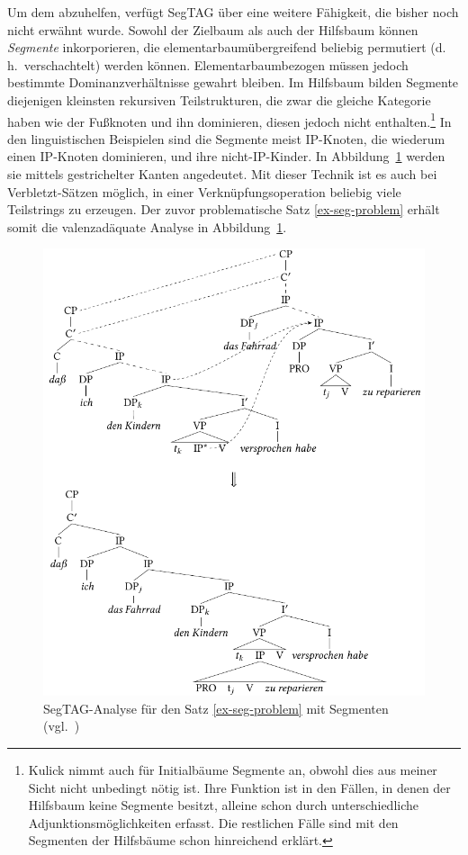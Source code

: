 Um dem abzuhelfen, verfügt SegTAG über eine weitere Fähigkeit, die bisher noch nicht erwähnt wurde. Sowohl der Zielbaum als auch der Hilfsbaum können {\it Segmente} inkorporieren, die elementarbaumübergreifend beliebig permutiert (d.\,h.\ verschachtelt) werden können. Elementarbaumbezogen müssen jedoch bestimmte Dominanzverhältnisse gewahrt bleiben. Im Hilfsbaum bilden Segmente diejenigen kleinsten rekursiven Teilstrukturen, die zwar die gleiche Kategorie haben wie der Fu\ss knoten und ihn dominieren, diesen jedoch nicht enthalten.\footnote{Kulick nimmt auch für Initialbäume Segmente an, obwohl dies aus meiner Sicht nicht unbedingt nötig ist. Ihre Funktion ist in den Fällen, in denen der Hilfsbaum keine Segmente besitzt, alleine schon durch unterschiedliche Adjunktionsmöglichkeiten erfasst. Die restlichen Fälle sind mit den Segmenten der Hilfsbäume schon hinreichend erklärt.} In den linguistischen Beispielen sind die Segmente meist IP-Knoten, die wiederum einen IP-Knoten dominieren, und ihre nicht-IP-Kinder. In Abbildung~\ref{fig-seg-ling2} werden sie mittels gestrichelter Kanten angedeutet. Mit dieser Technik ist es auch bei Verbletzt-Sätzen möglich, in einer Verknüpfungsoperation beliebig viele Teilstrings zu erzeugen. Der zuvor problematische Satz \ref{ex-seg-problem} erhält somit die valenzadäquate Analyse in Abbildung~\ref{fig-seg-ling2}.      

\begin{figure} 
\centering
\includegraphics{graphics/abb614.pdf}
\caption{SegTAG-Analyse für den Satz \ref{ex-seg-problem} mit Segmenten (vgl.\ \citealt[(159), (160)]{Kulick:00})\label{fig-seg-ling2}}
\end{figure}


